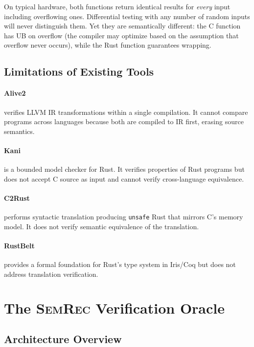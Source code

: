 \documentclass[11pt]{article}
\newcommand{\semrec}{\textsc{SemRec}}
\begin{document}
On typical hardware, both functions return identical results for \emph{every}
input including overflowing ones.  Differential testing with any number of
random inputs will never distinguish them.  Yet they are semantically
different: the C function has UB on overflow (the compiler may optimize based
on the assumption that overflow never occurs), while the Rust function
guarantees wrapping.

\subsection{Limitations of Existing Tools}

\paragraph{Alive2~\cite{alive2}} verifies LLVM IR transformations within a
single compilation.  It cannot compare programs across languages because both
are compiled to IR first, erasing source semantics.

\paragraph{Kani~\cite{kani}} is a bounded model checker for Rust.  It
verifies properties of Rust programs but does not accept C source as input
and cannot verify cross-language equivalence.

\paragraph{C2Rust~\cite{c2rust}} performs syntactic translation producing
\texttt{unsafe} Rust that mirrors C's memory model.  It does not verify
semantic equivalence of the translation.

\paragraph{RustBelt~\cite{rustbelt}} provides a formal foundation for Rust's
type system in Iris/Coq but does not address translation verification.

\section{The \semrec{} Verification Oracle}\label{sec:oracle}

\subsection{Architecture Overview}
\end{document}
